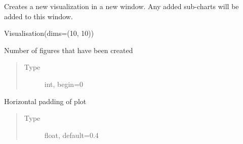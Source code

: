 \documentclass[letterpaper,10pt,english,openany,oneside]{sphinxmanual}
\begin{document}
\begin{fulllineitems}
\label{\detokenize{pygpc:pygpc.Visualization.Visualization}}
Creates a new visualization in a new window. Any added sub-charts will be added to this window.

Visualisation(dims=(10, 10))

\begin{fulllineitems}
\label{\detokenize{pygpc:pygpc.Visualization.Visualization.Visualisation.figure_number}}
Number of figures that have been created
\begin{quote}\begin{description}
\item[{Type}] \leavevmode
int, begin=0

\end{description}\end{quote}

\end{fulllineitems}


\begin{fulllineitems}
\label{\detokenize{pygpc:pygpc.Visualization.Visualization.Visualisation.horizontal_padding}}
Horizontal padding of plot
\begin{quote}\begin{description}
\item[{Type}] \leavevmode
float, default=0.4

\end{description}\end{quote}

\end{fulllineitems}



\end{fulllineitems}
\end{document}
